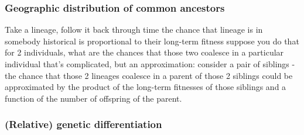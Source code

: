 \documentclass{ar-1col}
\newcommand{\todo}[1]{{\textbf{\color{red}{#1}}}}
\begin{document}
\subsubsection{Geographic distribution of common ancestors}

Take a lineage, follow it back through time
the chance that lineage is in somebody historical is proportional to their long-term fitness
suppose you do that for 2 individuals,
what are the chances that those two coalesce in a particular individual
that's complicated,
but an approximation:
consider a pair of siblings - the chance that those 2 lineages coalesce in a parent of those 2 siblings could be approximated by the product of the long-term fitnesses of those siblings
and a function of the number of offspring of the parent.

\todo{tidy and conclude}



\subsubsection{(Relative) genetic differentiation}
\end{document}
